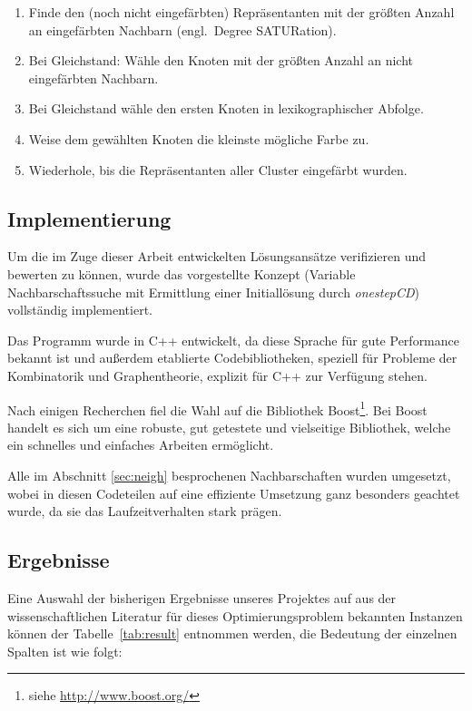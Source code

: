 \documentclass[paper=a4,fontsize=12pt]{scrartcl}
\begin{document}
\begin{enumerate}
    \item Finde den (noch nicht eingefärbten) Repräsentanten mit der größten Anzahl an eingefärbten Nachbarn (engl.\ Degree SATURation).
    \item Bei Gleichstand: Wähle den Knoten mit der größten Anzahl an nicht eingefärbten Nachbarn.
    \item Bei Gleichstand wähle den ersten Knoten in lexikographischer Abfolge.
    \item Weise dem gewählten Knoten die kleinste mögliche Farbe zu.
    \item Wiederhole, bis die Repräsentanten aller Cluster eingefärbt wurden.
\end{enumerate}

\subsection{Implementierung}
Um die im Zuge dieser Arbeit entwickelten Lösungsansätze verifizieren und bewerten zu können, wurde das vorgestellte Konzept (Variable Nachbarschaftssuche mit Ermittlung einer Initiallösung durch \emph{onestepCD}) vollständig implementiert.

Das Programm wurde in C++ entwickelt, da diese Sprache für gute Performance bekannt ist und außerdem etablierte Codebibliotheken, speziell für Probleme der Kombinatorik und Graphentheorie, explizit für C++ zur Verfügung stehen.

Nach einigen Recherchen fiel die Wahl auf die Bibliothek Boost\footnote{siehe \url{http://www.boost.org/}}. Bei Boost handelt es sich um eine robuste, gut getestete und vielseitige Bibliothek, welche ein schnelles und einfaches Arbeiten ermöglicht.

Alle im Abschnitt \ref{sec:neigh} besprochenen Nachbarschaften wurden umgesetzt, wobei in diesen Codeteilen auf eine effiziente Umsetzung ganz besonders geachtet wurde, da sie das Laufzeitverhalten stark prägen.

\subsection{Ergebnisse}

Eine Auswahl der bisherigen Ergebnisse unseres Projektes auf aus der wissenschaftlichen Literatur für dieses Optimierungsproblem bekannten Instanzen können der Tabelle~\ref{tab:result} entnommen werden, die Bedeutung der einzelnen Spalten ist wie folgt:
\end{document}
